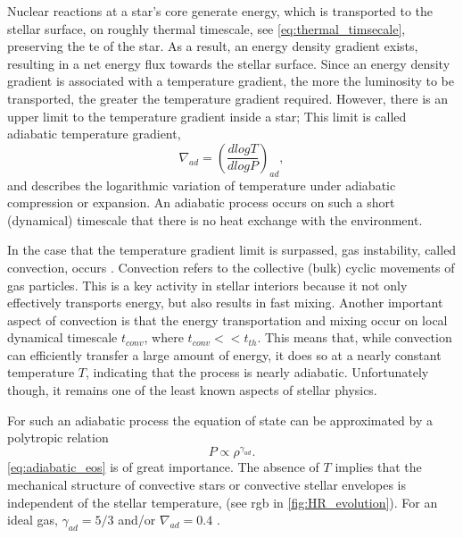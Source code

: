 Nuclear reactions at a star's core generate energy,
which is transported to the stellar surface, on roughly thermal timescale, see \cref{eq:thermal_timsecale}, preserving the \ac{te} of the star. As a result, an energy density gradient exists, resulting in a net energy flux towards the stellar surface. Since an energy density gradient is associated with a temperature gradient, the more the luminosity to be transported, the greater the temperature gradient required. However, there is an upper limit to the temperature gradient inside a star; This limit is called adiabatic temperature gradient,
\begin{equation}\label{eq:ad_tempe_grad}
    \nabla_{ad} = \left ( \frac{d logT}{d logP} \right)_{ad},
\end{equation}
and describes the logarithmic variation of temperature under adiabatic compression or expansion. An adiabatic process occurs on such a short (dynamical) timescale that there is no heat exchange with the environment.

In the case that the temperature gradient limit is surpassed, gas instability, called convection, occurs \citep{pols2011stellar}. Convection refers to the collective (bulk) cyclic movements of gas particles. This is a key activity in stellar interiors because it not only effectively transports energy, but also results in fast mixing. Another important aspect of convection is that the energy transportation and mixing occur on local dynamical timescale $t_{conv}$, where $t_{conv} << t_{th}$. This means that, while convection can efficiently transfer a large amount of energy, it does so at a nearly constant temperature $T$, indicating that the process is nearly adiabatic. Unfortunately though, it remains one of the least known aspects of stellar physics.

For such an adiabatic process the equation of state can be approximated by a polytropic relation
\begin{equation}\label{eq:adiabatic_eos}
    P \propto \rho^{\gamma_{ad}}.
\end{equation}
\cref{eq:adiabatic_eos} is of great importance. The absence of $T$ implies that the mechanical structure of convective stars or convective stellar envelopes is independent of the stellar temperature, (see \ac{rgb} in \cref{fig:HR_evolution}). For an ideal gas, ${\gamma_{ad}} = 5/3$ and/or $\nabla_{ad} = 0.4$ \citep{pols2011stellar}.

